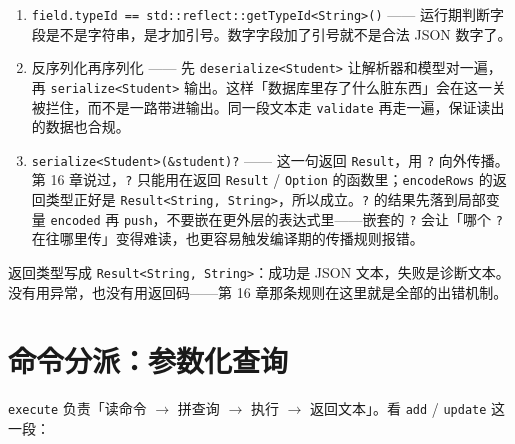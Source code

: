 \begin{enumerate}

\item \texttt{field.\allowbreak{}type\allowbreak{}Id =\allowbreak{}=\allowbreak{} std:\allowbreak{}:\allowbreak{}reflect:\allowbreak{}:\allowbreak{}get\allowbreak{}Type\allowbreak{}Id<\allowbreak{}String>\allowbreak{}(\allowbreak{})\allowbreak{}} —— 运行期判断字段是不是字符串，是才加引号。数字字段加了引号就不是合法 JSON 数字了。

\item 反序列化再序列化 —— 先 \texttt{deserialize<\allowbreak{}Student>\allowbreak{}} 让解析器和模型对一遍，再 \texttt{serialize<\allowbreak{}Student>\allowbreak{}} 输出。这样「数据库里存了什么脏东西」会在这一关被拦住，而不是一路带进输出。同一段文本走 \texttt{validate} 再走一遍，保证读出的数据也合规。

\item \texttt{serialize<\allowbreak{}Student>\allowbreak{}(\allowbreak{}\&student)\allowbreak{}?} —— 这一句返回 \texttt{Result}，用 \texttt{?} 向外传播。第 16 章说过，\texttt{?} 只能用在返回 \texttt{Result} / \texttt{Option} 的函数里；\texttt{encode\allowbreak{}Rows} 的返回类型正好是 \texttt{Result<\allowbreak{}String,\allowbreak{} String>\allowbreak{}}，所以成立。\texttt{?} 的结果先落到局部变量 \texttt{encoded} 再 \texttt{push}，不要嵌在更外层的表达式里——嵌套的 \texttt{?} 会让「哪个 \texttt{?} 在往哪里传」变得难读，也更容易触发编译期的传播规则报错。

\end{enumerate}

返回类型写成 \texttt{Result<\allowbreak{}String,\allowbreak{} String>\allowbreak{}}：成功是 JSON 文本，失败是诊断文本。没有用异常，也没有用返回码——第 16 章那条规则在这里就是全部的出错机制。

\section{命令分派：参数化查询}

\texttt{execute} 负责「读命令 \ensuremath{\rightarrow} 拼查询 \ensuremath{\rightarrow} 执行 \ensuremath{\rightarrow} 返回文本」。看 \texttt{add} / \texttt{update} 这一段：

